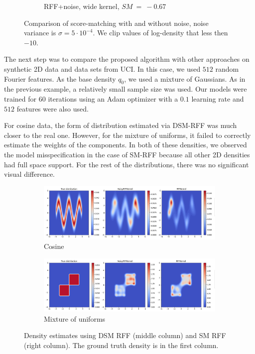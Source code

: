 \begin{figure}[!ht]
\begin{subfigure}[b]{0.32\textwidth}
    \captionsetup{justification=centering}
    \caption{RFF+noise, wide kernel, $SM~=~-0.67$}
    \label{sfig:MoGnoise1}
  \end{subfigure}
  \caption{Comparison of score-matching with and without noise,
    noise variance is
    $\sigma = 5\cdot10^{-4}$.
    We clip values of log-density that less then $-10$.
  }
  \label{fig:demo}
\end{figure}

The next step was to compare the proposed algorithm with other approaches on synthetic 2D data
and data sets from UCI.
In this case, we used $512$ random Fourier features.
As the base density $q_0$, we used a mixture of Gaussians.
As in the previous example, a relatively small sample size was used.
Our models were trained for $60$ iterations using an Adam optimizer with a $0.1$ learning rate and
$512$ features were also used.




For cosine data, the form of distribution estimated via DSM-RFF was much closer
to the real one.
However, for the mixture of uniforms, it failed to correctly estimate the weights
of the components.
In both of these densities, we observed the model misspecification in the case of SM-RFF
because all other 2D densities had full space support.
For the rest of the distributions, there was no significant visual difference.
\begin{figure}[!ht]
    \centering
    \begin{subfigure}[b]{\textwidth}
      \includegraphics[width=\textwidth]{figures/score_matching/2D/Cosine1000.png}
      \caption{Cosine}
      \label{sfig:1000Cos}
    \end{subfigure}
    \begin{subfigure}[b]{\textwidth}
      \includegraphics[width=\textwidth]{figures/score_matching/2D/Mixture1000.png}
      \caption{Mixture of uniforms}
      \label{sfig:1000Rings}
    \end{subfigure}
    \caption{Density estimates using DSM RFF (middle column) and SM RFF (right column).
    The ground truth density is in the first column.
    }
    \label{fig:2d_1000}
\end{figure}

